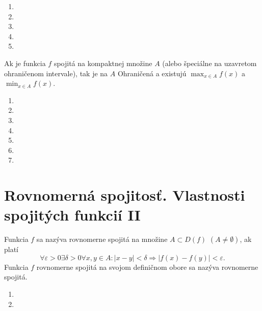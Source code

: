 \begin{enumerate}[resume]
	\item {}
	\item {}
	\item {}
	\item {}
	\item {}
\end{enumerate}

\begin{veta}
Ak je funkcia $f$ spojitá na kompaktnej množine $A$ (alebo špeciálne na uzavretom ohraničenom intervale), tak je na $A$ Ohraničená a existujú $\max_{x \in A}f(x)$ a $\min_{x \in A}f(x)$.
\end{veta}

\begin{enumerate}[resume]
	\item {}
	\item {}
	\item {}
	\item {}
	\item {}
	\item {}
	\item {}
\end{enumerate}

\section{Rovnomerná spojitosť. Vlastnosti spojitých funkcií II}
Funkcia $f$ sa nazýva rovnomerne spojitá na množine $A \subset D(f)$ $(A \neq \emptyset)$, ak platí 
$$\forall \varepsilon > 0 \exists \delta > 0 \forall x,y\in A: |x-y|<\delta \Rightarrow |f(x)-f(y)|<\varepsilon.$$
Funkcia $f$ rovnomerne spojitá na svojom definičnom obore sa nazýva rovnomerne spojitá.

\begin{enumerate}[resume]
	\item {}
	\item {}
\end{enumerate}

